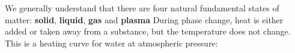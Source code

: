 We generally understand that there are four natural fundamental states of
matter: \textbf{solid}, \textbf{liquid}, \textbf{gas} and \textbf{plasma}
%
%
%
%
%  
%
%  
%
%
%
%
During phase change, heat is either added or taken away from a substance, but
the temperature does not change. This is a heating curve for water at
atmospheric pressure:
%
%
%
%
